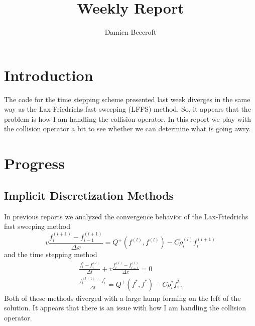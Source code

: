 \documentclass{article}
\title{Weekly Report}
\author{Damien Beecroft}
\begin{document}
\maketitle
\section{Introduction}
The code for the time stepping scheme presented last week diverges in the same way as the Lax-Friedrichs fast sweeping (LFFS) method. So, it appears that the problem is how I am handling the collision operator. In this report we play with the collision operator a bit to see whether we can determine what is going awry.
\section{Progress}
\subsection{Implicit Discretization Methods}
In previous reports we analyzed the convergence behavior of the Lax-Friedrichs fast sweeping method
\[
    v \frac{f_i^{(l+1)} - f_{i-1}^{(l+1)}}{\Delta x} = Q^+(f^{(l)}, f^{(l)}) - C \rho_i^{(l)} f_i^{(l+1)}
\]
and the time stepping method
\begin{gather*}
    \frac{f_i^* - f_i^{(l)}}{\Delta t} + v \frac{f_i^{(l)} - f_{i-1}^{(l)}}{\Delta x} = 0\\
    \frac{f_i^{(l+1)} - f^*_i}{\Delta t} = Q^+(f^*,f^*) - C \rho_i^* f^*_i.
\end{gather*}
Both of these methods diverged with a large hump forming on the left of the solution. It appears that there is an issue with how I am handling the collision operator.
\end{document}
